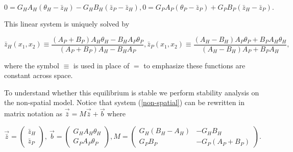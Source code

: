 \documentclass{article}
\begin{document}
\begin{subequations}
  \begin{equation}
    0=G_HA_H(\theta_H-\bar z_H)-G_HB_H(\bar z_P-\bar z_H),
  \end{equation}
  \begin{equation}
    0=G_PA_P(\theta_P-\bar z_P)+G_PB_P(\bar z_H-\bar z_P).
  \end{equation}
\end{subequations}

This linear system is uniquely solved by

\begin{subequations}\label{non-spatial-eq}
  \begin{equation}
    \bar z_H(x_1,x_2)\equiv\frac{(A_P+B_P)A_H\theta_H-B_HA_P\theta_P}{(A_P+B_P)A_H-B_HA_P},
  \end{equation}
  \begin{equation}
    \bar z_P(x_1,x_2)\equiv\frac{(A_H-B_H)A_P\theta_P+B_PA_H\theta_H}{(A_H-B_H)A_P+B_PA_H},
  \end{equation}
\end{subequations}

where the symbol \(\equiv\) is used in place of \(=\) to emphasize these
functions are constant across space.

To understand whether this equilibrium is stable we perform stability
analysis on the non-spatial model. Notice that system
(\ref{non-spatial}) can be rewritten in matrix notation as
\(\vec{\bar z}=M\vec{\bar z}+\vec b\) where

\begin{subequations}
  \begin{equation}
    \vec{\bar z}=\left(\begin{matrix}
      \bar z_H \\ \bar z_P
    \end{matrix}\right), \ 
    \vec b =\left(\begin{matrix}
      G_HA_H\theta_H \\ G_PA_P\theta_P
    \end{matrix}\right),
  \end{equation}
  \begin{equation}
    M=\left(\begin{matrix}
      G_H(B_H-A_H) & -G_HB_H \\
      G_PB_P & -G_P(A_P+B_P)
    \end{matrix}\right).
  \end{equation}
\end{subequations}
\end{document}
